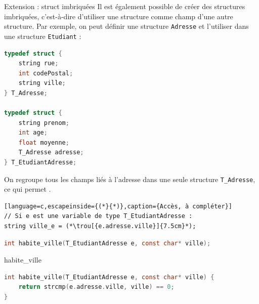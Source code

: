 
\begin{UPSTIexercice}{Extension : struct imbriquées}
    Il est également possible de créer des structures imbriquées, c'est-à-dire d'utiliser une structure comme champ d'une autre structure. Par exemple, on peut définir une structure \texttt{Adresse} et l'utiliser dans une structure \texttt{Etudiant} :
    \begin{lstlisting}[language=C]
typedef struct {
    string rue;
    int codePostal;
    string ville;
} T_Adresse;

typedef struct {
    string prenom;
    int age;
    float moyenne;
    T_Adresse adresse;
} T_EtudiantAdresse;
\end{lstlisting}


    On regroupe tous les champs liés à l'adresse dans une seule structure \texttt{T\_Adresse}, ce qui permet
    .


    \begin{lstlisting}[language=c,escapeinside={(*}{*)},caption={Accès, à compléter}]
// Si e est une variable de type T_EtudiantAdresse :
string ville_e = (*\trou[{e.adresse.ville}]{7.5cm}*);
\end{lstlisting}


    \begin{lstlisting}[language=c,caption={Prototype}]
int habite_ville(T_EtudiantAdresse e, const char* ville);
\end{lstlisting}

\begin{UPSTIeleveOnlyEnv}
\end{UPSTIeleveOnlyEnv}

\begin{UPSTIcorrectionP}{habite\_ville}
\begin{lstlisting}[language=c,caption={Correction}]
int habite_ville(T_EtudiantAdresse e, const char* ville) {
    return strcmp(e.adresse.ville, ville) == 0;
}
\end{lstlisting}
\end{UPSTIcorrectionP}
\end{UPSTIexercice}


